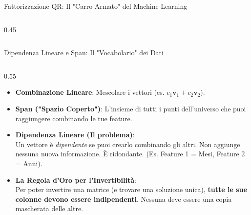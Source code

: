 \documentclass[aspectratio=169, 10pt]{beamer}
\begin{document}
\begin{frame}{Fattorizzazione QR: Il "Carro Armato" del Machine Learning}
\begin{columns}[T,onlytextwidth]
\begin{column}{0.45\textwidth}
        \end{column}
    \end{columns}
\end{frame}

\begin{frame}{Dipendenza Lineare e Span: Il "Vocabolario" dei Dati}
    \begin{columns}[T,onlytextwidth]
        \begin{column}{0.55\textwidth}
            \small
            \vspace{0.1cm}
            \begin{itemize}
                \setlength\itemsep{0.7em}
                \item \textbf{Combinazione Lineare}: Mescolare i vettori (es. $c_1 \mathbf{v}_1 + c_2 \mathbf{v}_2$).
                \item \textbf{Span ("Spazio Coperto")}: L'insieme di tutti i punti dell'universo che puoi raggiungere combinando le tue feature.
                \vspace{0.1cm}
                \item \textbf{Dipendenza Lineare (Il problema)}:\\
                Un vettore è \textit{dipendente} se puoi crearlo combinando gli altri. Non aggiunge nessuna nuova informazione. È ridondante. (Es. Feature 1 = Mesi, Feature 2 = Anni).
                
                \item \textbf{La Regola d'Oro per l'Invertibilità}:\\
                Per poter invertire una matrice (e trovare una soluzione unica), \textbf{tutte le sue colonne devono essere indipendenti}. Nessuna deve essere una copia mascherata delle altre.
            \end{itemize}
        \end{column}
        

\end{columns}
\end{frame}
\end{document}
